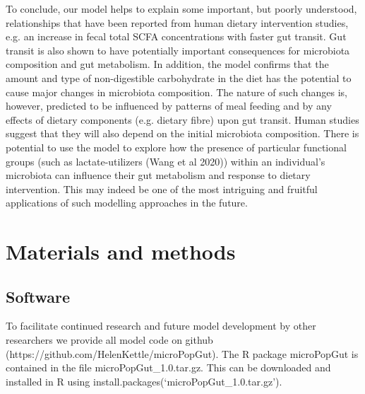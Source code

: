 \documentclass[a4paper]{article}
\begin{document}
To conclude, our model helps to explain some important, but poorly understood, relationships that have been reported from human dietary intervention studies, e.g. an increase in fecal total SCFA concentrations with faster gut transit. 
Gut transit is also shown to have potentially important consequences for microbiota composition and gut metabolism. In addition, the model confirms that the amount and type of non-digestible carbohydrate in the diet has the potential to cause major changes in microbiota composition. 
The nature of such changes is, however, predicted to be influenced by patterns of meal feeding and by any effects of dietary components (e.g. dietary fibre) upon gut transit. 
Human studies suggest that they will also depend on the initial microbiota composition. 
There is potential to use the model to explore how the presence of particular functional groups (such as lactate-utilizers (Wang et al 2020)) within an individual’s microbiota can influence their gut metabolism and response to dietary intervention. This may indeed be one of the most intriguing and fruitful applications of such modelling approaches in the future.

\section*{Materials and methods}

\subsection*{Software}
To facilitate continued research and future model development by other researchers we provide all model code on github (https://github.com/HelenKettle/microPopGut). The R package microPopGut is contained in the file microPopGut\_1.0.tar.gz. This can be downloaded and installed in R using install.packages(`microPopGut\_1.0.tar.gz').

\end{document}

